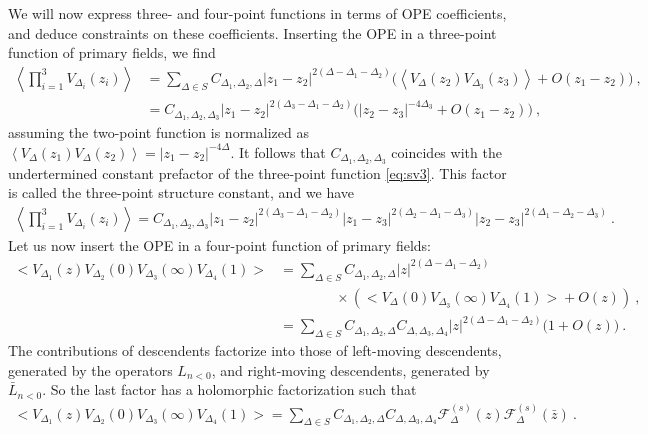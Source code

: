 \documentclass[12pt, a4paper]{article}
\theoremstyle{break}
\begin{document}
We will now express three- and four-point functions in terms of OPE coefficients, and deduce constraints on these coefficients.
Inserting the OPE in a three-point function of primary fields, we find 
\begin{align}
 \left<\prod_{i=1}^3 V_{\Delta_i}(z_i) \right> & = \sum_{\Delta\in S}C_{\Delta_1,\Delta_2,\Delta} |z_1-z_2|^{2(\Delta-\Delta_1-\Delta_2)}
 \Big(\left< V_{\Delta}(z_2) V_{\Delta_3}(z_3) \right> +O(z_1-z_2)\Big) \ ,
 \\
& =  C_{\Delta_1,\Delta_2,\Delta_3} |z_1-z_2|^{2(\Delta_3-\Delta_1-\Delta_2)} \Big( |z_2-z_3|^{-4\Delta_3} + O(z_1-z_2)\Big)\ ,
\end{align}
assuming the two-point function is normalized as $\left< V_{\Delta}(z_1)V_{\Delta}(z_2) \right> = |z_1-z_2|^{-4\Delta}$.
It follows that $C_{\Delta_1,\Delta_2,\Delta_3}$ coincides with the undertermined constant prefactor of the three-point function \eqref{eq:sv3}. This factor is called the three-point structure constant, and we have
\begin{align}
 \left<\prod_{i=1}^3 V_{\Delta_i}(z_i) \right> = C_{\Delta_1,\Delta_2,\Delta_3} |z_1-z_2|^{2(\Delta_3-\Delta_1-\Delta_2)} |z_1-z_3|^{2(\Delta_2-\Delta_1-\Delta_3)} |z_2-z_3|^{2(\Delta_1-\Delta_2-\Delta_3)}\ .
\end{align}
Let us now insert the OPE in a four-point function of primary fields:
\begin{align}
 \Big<V_{\Delta_1}(z)V_{\Delta_2}(0)V_{\Delta_3}(\infty)V_{\Delta_4}(1)\Big>
 &= \sum_{\Delta\in S} C_{\Delta_1,\Delta_2,\Delta} |z|^{2(\Delta-\Delta_1-\Delta_2)}
 \nonumber
\\ & \qquad \qquad \times 
 \left(\Big< V_\Delta(0)V_{\Delta_3}(\infty)V_{\Delta_4}(1)\Big> + O(z)\right) \ ,
 \\
 &=  \sum_{\Delta\in S} C_{\Delta_1,\Delta_2,\Delta} C_{\Delta,\Delta_3,\Delta_4}
|z|^{2(\Delta-\Delta_1-\Delta_2)} \Big(1 +O(z) \Big)\ .
\end{align}
The contributions of descendents factorize into those of left-moving descendents, generated by the operators $L_{n<0}$, and right-moving descendents, generated by $\bar L_{n<0}$. So the last factor has a holomorphic factorization such that 
\begin{align}
\Big<V_{\Delta_1}(z)V_{\Delta_2}(0)V_{\Delta_3}(\infty)V_{\Delta_4}(1)\Big>
 =\sum_{\Delta\in S} C_{\Delta_1,\Delta_2,\Delta} C_{\Delta,\Delta_3,\Delta_4}  \mathcal{F}^{(s)}_\Delta(z) \mathcal{F}^{(s)}_\Delta(\bar z)\ .
 \label{sdec}
\end{align}
\end{document}
